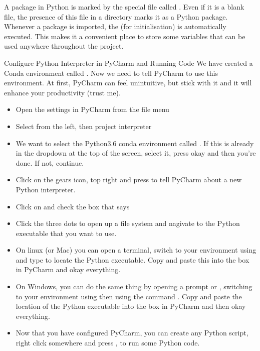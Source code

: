 \documentclass[../main]{subfiles}
\begin{document}
A package in Python is marked by the special file called . Even if it is a blank file,
the presence of this file in a directory marks it as a Python package. Whenever a package is imported, the
 (for initialisation) is automatically executed. This makes it a convenient place to store
some variables that can be used anywhere throughout the project.

\begin{Task}{Configure Python Interpreter in PyCharm and Running Code}
We have created a Conda environment called . Now we need to tell PyCharm to use this environment. At first,
PyCharm can feel unintuitive, but stick with it and it will enhance your productivity (trust me).

\begin{itemize}
\item Open the settings in PyCharm from the file menu
\item Select  from the left, then project interpreter
\item We want to select the Python3.6 conda environment called . If this is already in the dropdown
at the top of the screen, select it, press okay and then you're done. If not, continue.
\item Click on the gears icon, top right and press  to tell PyCharm about a new Python interpreter.
\item Click on  and check the box that says 
\item Click the three dots to open up a file system and nagivate to the Python executable that you want to use.
\item On linux (or Mac) you can open a terminal, switch to your  environment using 
and type  to locate the Python executable. Copy and paste this into the box in PyCharm
and okay everything.
\item On Windows, you can do the same thing by opening a  prompt or , switching to your
 environment using  then using the command . Copy and paste
the location of the Python executable into the box in PyCharm and then okay everything.
\item Now that you have configured PyCharm, you can create any Python script, right click somewhere and
press , to run some Python code.
\end{itemize}

\end{Task}
\end{document}
